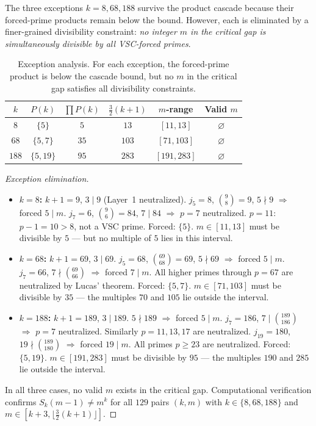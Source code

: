 \documentclass[12pt,a4paper]{article}
\theoremstyle{plain}
\theoremstyle{definition}
\begin{document}
The three exceptions $k = 8, 68, 188$ survive the product cascade because
their forced-prime products remain below the bound.  However, each is
eliminated by a finer-grained divisibility constraint: \emph{no integer
$m$ in the critical gap is simultaneously divisible by all VSC-forced
primes}.

\begin{table}[htbp]
\centering
\caption{Exception analysis.  For each exception, the forced-prime product
  is below the cascade bound, but no $m$ in the critical gap satisfies all
  divisibility constraints.}
\label{tab:exceptions}
\begin{tabular}{cccccc}
\toprule
$k$ & $P(k)$ & $\prod P(k)$ & $\frac{3}{2}(k+1)$ & $m$-range & Valid $m$ \\
\midrule
$8$   & $\{5\}$        & $5$   & $13$   & $[11, 13]$   & $\varnothing$ \\
$68$  & $\{5, 7\}$     & $35$  & $103$  & $[71, 103]$  & $\varnothing$ \\
$188$ & $\{5, 19\}$    & $95$  & $283$  & $[191, 283]$ & $\varnothing$ \\
\bottomrule
\end{tabular}
\end{table}

\begin{proof}[Exception elimination]
  \begin{itemize}[nosep]
    \item \textbf{$k = 8$:} $k+1 = 9$, $3 \mid 9$ (Layer~1 neutralized).
      $j_5 = 8$, $\binom{9}{8} = 9$, $5 \nmid 9$ $\Rightarrow$ forced
      $5 \mid m$.  $j_7 = 6$, $\binom{9}{6} = 84$, $7 \mid 84$
      $\Rightarrow$ $p=7$ neutralized.  $p=11$: $p-1 = 10 > 8$, not a
      VSC prime.  Forced: $\{5\}$.  $m \in [11,13]$ must be divisible
      by $5$ --- but no multiple of $5$ lies in this interval.

    \item \textbf{$k = 68$:} $k+1 = 69$, $3 \mid 69$.  $j_5 = 68$,
      $\binom{69}{68} = 69$, $5 \nmid 69$ $\Rightarrow$ forced
      $5 \mid m$.  $j_7 = 66$, $7 \nmid \binom{69}{66}$ $\Rightarrow$
      forced $7 \mid m$.  All higher primes through $p = 67$ are
      neutralized by Lucas' theorem.  Forced: $\{5, 7\}$.
      $m \in [71,103]$ must be divisible by $35$ --- the multiples
      $70$ and $105$ lie outside the interval.

    \item \textbf{$k = 188$:} $k+1 = 189$, $3 \mid 189$.
      $5 \nmid 189$ $\Rightarrow$ forced $5 \mid m$.
      $j_7 = 186$, $7 \mid \binom{189}{186}$ $\Rightarrow$
      $p=7$ neutralized.  Similarly $p = 11, 13, 17$ are neutralized.
      $j_{19} = 180$, $19 \nmid \binom{189}{180}$ $\Rightarrow$
      forced $19 \mid m$.  All primes $p \ge 23$ are neutralized.
      Forced: $\{5, 19\}$.  $m \in [191,283]$ must be divisible by
      $95$ --- the multiples $190$ and $285$ lie outside the interval.
  \end{itemize}
  In all three cases, no valid $m$ exists in the critical gap.
  Computational verification confirms $S_k(m-1) \neq m^k$ for all
  $129$ pairs $(k,m)$ with $k \in \{8,68,188\}$ and
  $m \in [k+3, \lfloor\frac{3}{2}(k+1)\rfloor]$.
\end{proof}
\end{document}
